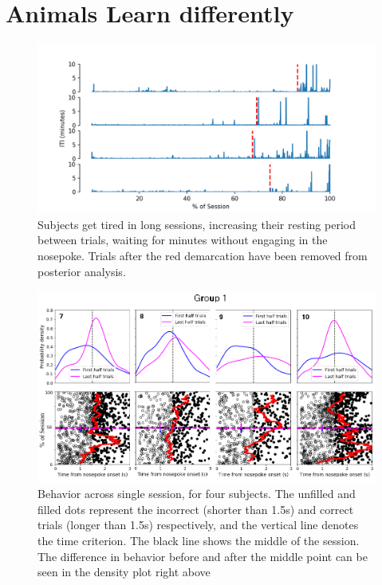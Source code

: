 \chapter{Animals Learn differently}
\label{chap:learning}


\begin{figure}
    \centering
    \includegraphics[width=\textwidth]{figures/iti.png}
    \caption[Subjects get tired in long sessions]{Subjects get tired in long sessions, increasing their resting period between trials, waiting for minutes without engaging in the nosepoke. Trials after the red demarcation have been removed from posterior analysis.}
    \label{fig:iti}
\end{figure}

\begin{figure}
    \centering
    \includegraphics[width=\textwidth]{figures/grupo1.png}
    \caption[Behavior across single session]{Behavior across single session, for four subjects. The unfilled and filled dots represent the incorrect (shorter than 1.5s) and correct trials (longer than 1.5s) respectively, and the vertical line denotes the time criterion. The black line shows the middle of the session. The difference in behavior before and after the middle point can be seen in the density plot right above}
    \label{fig:behavior}
\end{figure} 


